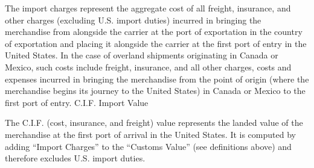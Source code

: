 \documentclass[a4paper,11pt]{article}
\begin{document}
The import charges represent the aggregate cost of all freight, insurance, and other charges (excluding U.S. import duties) incurred in bringing the merchandise from alongside the carrier at the port of exportation in the country of exportation and placing it alongside the carrier at the first port of entry in the United States. In the case of overland shipments originating in Canada or Mexico, such costs include freight, insurance, and all other charges, costs and expenses incurred in bringing the merchandise from the point of origin (where the merchandise begins its journey to the United States) in Canada or Mexico to the first port of entry.
C.I.F. Import Value

The C.I.F. (cost, insurance, and freight) value represents the landed value of the merchandise at the first port of arrival in the United States. It is computed by adding ``Import Charges'' to the ``Customs Value'' (see definitions above) and therefore excludes U.S. import duties.


\end{document}
